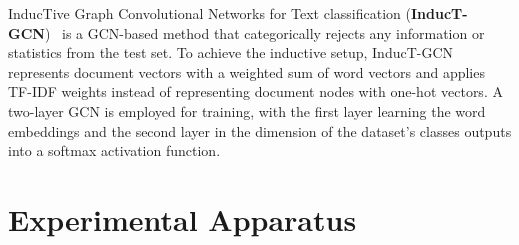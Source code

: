 \documentclass[runningheads]{llncs}
\begin{document}
InducTive Graph Convolutional Networks for Text classification (\textbf{InducT-GCN})~\cite{wang2022induct} is a \ac{GCN}-based method that categorically rejects any information or statistics from the test set. 
To achieve the inductive setup, InducT-GCN represents document vectors with a weighted sum of word vectors and applies TF-IDF weights instead of representing document nodes with one-hot vectors.
A two-layer GCN is employed for training, with the first layer learning the word embeddings and the second layer in the dimension of the dataset's classes outputs into a softmax activation function. 

\section{Experimental Apparatus}
\label{sec:experiments}
\end{document}
